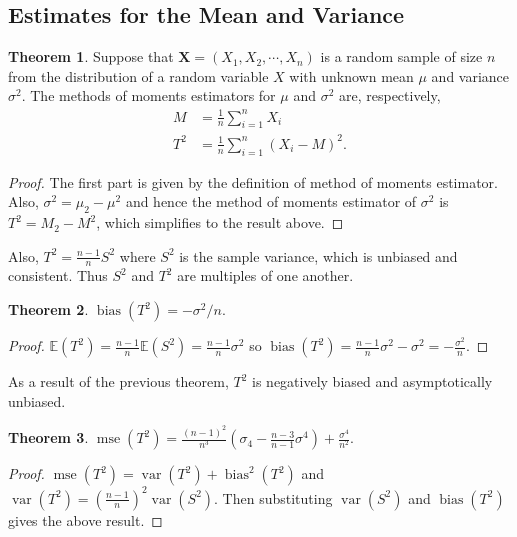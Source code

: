 \documentclass[a4paper,12pt]{article}
\theoremstyle{definition}
\newtheorem{theorem}{Theorem}[section]
\theoremstyle{definition}
\theoremstyle{definition}
\newcommand{\bs}{\boldsymbol}
\newcommand{\var}{\operatorname{var}}
\newcommand{\bias}{\operatorname{bias}}
\newcommand{\mse}{\operatorname{mse}}
\begin{document}
    \subsection{Estimates for the Mean and Variance}
    \begin{theorem}
        Suppose that $\bs{X} = (X_1, X_2, \cdots, X_n)$ is a random sample of size $n$ from the distribution of a random variable $X$ with unknown mean $\mu$ and variance $\sigma^2$. The methods of moments estimators for $\mu$ and $\sigma^2$ are, respectively,
        \begin{align*}
            M &= \frac{1}{n} \sum_{i = 1}^n X_i \\
            T^2 &= \frac{1}{n} \sum_{i = 1}^n (X_i - M)^2.
        \end{align*}
        \begin{proof}
            The first part is given by the definition of method of moments estimator. Also, $\sigma^2 = \mu_2 - \mu^2$ and hence the method of moments estimator of $\sigma^2$ is $T^2 = M_2 - M^2$, which simplifies to the result above.
        \end{proof}
    \end{theorem}
    Also, $T^2 = \frac{n - 1}{n} S^2$ where $S^2$ is the sample variance, which is unbiased and consistent. Thus $S^2$ and $T^2$ are multiples of one another. \par
    \begin{theorem}
        $\bias \left( T^2 \right) = -\sigma^2 / n$.
        \begin{proof}
            $\mathbb{E} \left( T^2 \right) = \frac{n - 1}{n} \mathbb{E} \left( S^2 \right) = \frac{n - 1}{n} \sigma^2$ so $\bias \left( T^2 \right) = \frac{n - 1}{n} \sigma^2 - \sigma^2 = -\frac{\sigma^2}{n}$.
        \end{proof}
    \end{theorem}
    As a result of the previous theorem, $T^2$ is negatively biased and asymptotically unbiased. \par
    \begin{theorem}
        $\mse \left( T^2 \right) = \frac{(n - 1)^2}{n^3} \left( \sigma_4 - \frac{n - 3}{n - 1} \sigma^4 \right) + \frac{\sigma^4}{n^2}$.
        \begin{proof}
            $\mse \left( T^2 \right) = \var \left( T^2 \right) + \bias^2 \left( T^2 \right)$ and $\var \left( T^2 \right) = \left( \frac{n - 1}{n} \right)^2 \var \left( S^2 \right)$. Then substituting $\var \left( S^2 \right)$ and $\bias \left( T^2 \right)$ gives the above result.
        \end{proof}
    \end{theorem}
\end{document}
